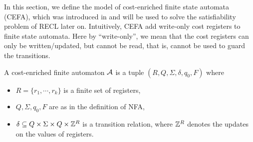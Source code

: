 %

In this section, we define the model of cost-enriched finite state automata (CEFA), which was introduced in \cite{atva2020} and will be used to solve the satisfiability problem of RECL later on. 
%
Intuitively, CEFA add write-only cost registers to finite state automata. Here by ``write-only'', we mean that the cost registers can only be written/updated, but cannot be read, that is, cannot be used to guard the transitions. 

%
\begin{definition}
  A cost-enriched finite automaton $\mathcal{A}$ is a tuple $(R, Q, \Sigma, \delta, q_0, F)$ where
  \begin{itemize}
  \item $R = \{r_1, \cdots, r_k\}$ is a finite set of registers, 
    \item $Q, \Sigma, q_0, F$ are as in the definition of NFA,
    \item $\delta \subseteq Q \times \Sigma \times Q \times \mathbb{Z}^R$ is a transition relation, where $\mathbb{Z}^R$ denotes the updates on the values of registers.
  \end{itemize}
\end{definition}

